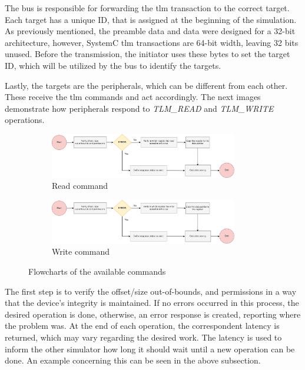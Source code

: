 The bus is responsible for forwarding the \gls{tlm} transaction to the correct target. Each target has a unique ID, that is assigned 
at the beginning of the simulation. As previously mentioned, the preamble data and data were designed for a 32-bit architecture, however, 
SystemC \gls{tlm} transactions are 64-bit width, leaving 32 bits unused. Before the transmission, the initiator uses these bytes to set the 
target ID, which will be utilized by the bus to identify the targets.

Lastly, the targets are the peripherals, which can be different from each other. These receive the 
\gls{tlm} commands and act accordingly. The next images demonstrate how peripherals respond to \textit{TLM\_READ} and \textit{TLM\_WRITE} 
\space operations. 

\begin{figure}[H]
	\centering
	\begin{subfigure}{\textwidth}
		\centering
		\includegraphics[width=0.9\textwidth]{Images/CoSimReadOperation.png}
 		\caption[1\textwidth]{Read command}
	\end{subfigure}
	\begin{subfigure}{\textwidth}
		\centering
		\includegraphics[width=0.9\textwidth]{Images/CoSimWriteOperation.png}
		\caption[1\textwidth]{Write command}
	\end{subfigure}
		
	\caption{Flowcharts of the available commands}
\end{figure}

The first step is to verify the offset/size out-of-bounds, and permissions in a way that the device's integrity is maintained. If no errors occurred 
in this process, the desired operation is done, otherwise, an error response is created, reporting where the problem was. 
At the end of each operation, the correspondent latency is returned, which may vary regarding the desired work. The latency is used to inform the 
other simulator how long it should wait until a new operation can be done. An example concerning this can be seen in the above subsection.  

